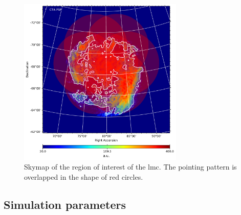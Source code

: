 \documentclass[main.tex]{subfiles}
\begin{document}
\begin{figure}
  \centering
  \includegraphics[width=0.7\textwidth]{Pictures/lmc_hi_cdensity_flipped_plot_1000GeV_1TeV.pdf}
  \caption{\label{fig:pointings} Skymap of the region of interest of the \gls{lmc}. The pointing pattern is overlapped in the shape of red circles.}
\end{figure}

\subsection{Simulation parameters}
\end{document}
